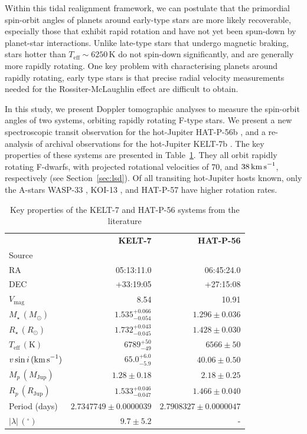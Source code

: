 \documentclass[useAMS,usenatbib]{mn2e}
\begin{document}
Within this tidal realignment framework, we can postulate that the primordial spin-orbit angles of planets around early-type stars are more likely recoverable, especially those that exhibit rapid rotation and have not yet been spun-down by planet-star interactions. Unlike late-type stars that undergo magnetic braking, stars hotter than $T_\text{eff} \sim 6250\,\text{K}$ do not spin-down significantly, and are generally more rapidly rotating. One key problem with characterising planets around rapidly rotating, early type stars is that precise radial velocity measurements needed for the Rossiter-McLaughlin effect \citep{1924ApJ....60...15R,1924ApJ....60...22M} are difficult to obtain.

In this study, we present Doppler tomographic analyses to measure the spin-orbit angles of two systems, orbiting rapidly rotating F-type stars. We present a new spectroscopic transit observation for the hot-Jupiter HAT-P-56b \citep{2015AJ....150...85H}, and a re-analysis of archival observations for the hot-Jupiter KELT-7b \citep{2015AJ....150...12B}. The key properties of these systems are presented in Table~\ref{tab:literature_properties}. They all orbit rapidly rotating F-dwarfs, with projected rotational velocities of $70$, and $38\,\text{km\,s}^{-1}$, respectively (see Section~\ref{sec:lsd}). Of all transiting hot-Jupiter hosts known, only the A-stars WASP-33 \citep{2010MNRAS.407..507C}, KOI-13 \citep{2014ApJ...790...30J}, and HAT-P-57 \citep{2015AJ....150..197H} have higher rotation rates.



\begin{table}
  
  \caption{\label{tab:literature_properties}Key properties of the KELT-7 and HAT-P-56 systems from the literature}
  \begin{tabular}{lrr}
    \hline\hline
    &  \textbf{KELT-7} & \textbf{HAT-P-56}\\
    Source & \citet{2015AJ....150...12B} & \citet{2015AJ....150...85H}\\
    \hline
    RA &  05:13:11.0 & 06:45:24.0\\
    DEC &  +33:19:05 & +27:15:08\\
    $V_\text{mag}$ &  8.54 & 10.91\\
    $M_\star \, (M_\odot)$ &  $1.535_{-0.054}^{+0.066}$ & $1.296\pm0.036$ \\
    $R_\star \, (R_\odot)$ &  $1.732_{-0.045}^{+0.043}$ & $1.428\pm0.030$\\
    $T_\text{eff}\,(\text{K})$  &$6789_{-49}^{+50}$ & $6566\pm50$\\
    $v\sin i\,(\text{km\,s}^{-1})$  & $65.0_{-5.9}^{+6.0}$ & $40.06\pm0.50$\\
    $M_p\,(M_\text{Jup})$  & $1.28\pm0.18$ & $2.18\pm0.25$\\
    $R_p\,(R_\text{Jup})$  & $1.533_{-0.047}^{+0.046}$ & $1.466\pm0.040$\\
    Period (days)  & $2.7347749\pm0.0000039$ & $2.7908327\pm0.0000047$\\
    $|\lambda|\,(^\circ)$  & $9.7\pm5.2$ & -\\
    \hline
  \end{tabular}
\end{table}
\end{document}
